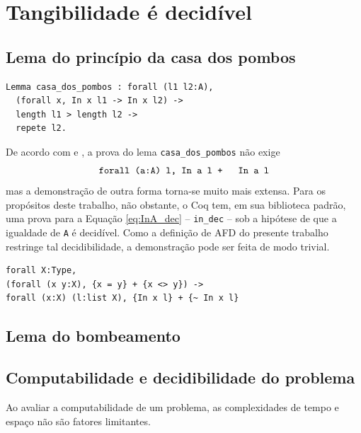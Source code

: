 \chapter{Tangibilidade é decidível}

\section{Lema do princípio da casa dos pombos}


\begin{verbatim}
Lemma casa_dos_pombos : forall (l1 l2:A),
  (forall x, In x l1 -> In x l2) ->
  length l1 > length l2 ->
  repete l2.
\end{verbatim}

De acordo com  e , a prova do lema \texttt{casa_dos_pombos} não exige \begin{equation}\label{eq:InA_dec}\text{\texttt{forall (a:A) l, {In a l} + {~ In a l}}}\end{equation} mas a demonstração de outra forma torna-se muito mais extensa. Para os propósitos deste trabalho, não obstante, o Coq tem, em sua biblioteca padrão, uma prova para a Equação \ref{eq:InA_dec} -- \texttt{in_dec} -- sob a hipótese de que a igualdade de \texttt{A} é decidível. Como a definição de AFD do presente trabalho restringe tal decidibilidade, a demonstração pode ser feita de modo trivial.

\begin{verbatim}
forall X:Type,
(forall (x y:X), {x = y} + {x <> y}) ->
forall (x:X) (l:list X), {In x l} + {~ In x l}
\end{verbatim}

\section{Lema do bombeamento}



\section{Computabilidade e decidibilidade do problema}

Ao avaliar a computabilidade de um problema, as complexidades de tempo e espaço não são fatores limitantes.
